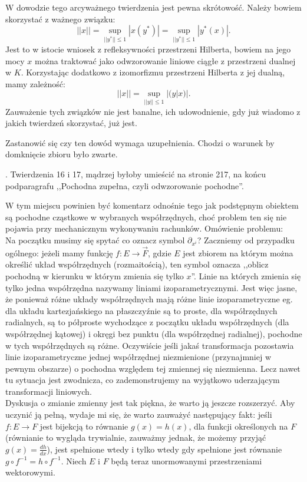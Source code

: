 \documentclass[a4paper,11pt]{article}
\begin{document}
\start {} W dowodzie tego arcyważnego twierdzenia jest pewna
skrótowość. Należy bowiem skorzystać z ważnego związku:
$$|| x || = \sup_{ || y^{ * } || \leq1 } | x( y^{ * } ) | = \sup_{ || y^{ * } || \leq1 } | y^{ * }( x ) | \textrm{.}$$
Jest to w istocie wniosek z refleksywności przestrzeni Hilberta,
bowiem na jego mocy $x$ można traktować jako odwzorowanie liniowe
ciągłe z przestrzeni dualnej w $K$. Korzystając dodatkowo z
izomorfizmu przestrzeni Hilberta z jej dualną, mamy \linebreak
zależność:
$$|| x || = \sup_{ || y || \leq 1 } | ( y | x ) | \textrm{.}$$
Zauważenie tych związków nie jest banalne, ich udowodnienie, gdy już
wiadomo z jakich twierdzeń skorzystać, już jest.

\start {} Zastanowić się czy ten dowód wymaga uzupełnienia.
Chodzi o warunek by domknięcie zbioru było zwarte.

\start {}. Twierdzenia 16 i 17, mądrzej byłoby umieścić na
stronie 217, na końcu podparagrafu ,,Pochodna zupełna, czyli
odwzorowanie pochodne''.
  
\start {} W tym miejscu powinien być komentarz odnośnie tego
jak podstępnym obiektem są pochodne cząstkowe w wybranych
współrzędnych, choć problem ten się nie pojawia przy mechanicznym
wykonywaniu rachunków.
Omówienie problemu: \\
Na początku musimy się spytać co oznacz symbol $\partial_{ x^{ i } }$?
Zaczniemy od przypadku ogólnego: jeżeli mamy funkcję
$f : E \rightarrow \vec{ F }$, gdzie $E$ jest zbiorem na którym można
określić układ współrzędnych (rozmaitością), ten symbol oznacza
,,oblicz pochodną w kierunku w którym zmienia się tylko $x$''. Linie
na których zmienia się tylko jedna współrzędna nazywamy liniami
izoparametrycznymi. Jest więc jasne, że ponieważ różne układy
współrzędnych mają różne linie izoparametryczne eg. dla układu
kartezjańskiego na płaszczyźnie są to proste, dla współrzędnych
radialnych, są to półproste wychodzące z początku układu współrzędnych
(dla współrzędnej kątowej) i okręgi bez punktu (dla współrzędnej
radialnej), pochodne w tych współrzędnych są różne. Oczywiście jeśli
jakaś transformacja pozostawia linie izoparametryczne jednej
współrzędnej niezmienione (przynajmniej w pewnym obszarze) o pochodna
względem tej zmiennej się niezmienna. Lecz nawet tu sytuacja jest
zwodnicza, co zademonstrujemy na wyjątkowo uderzającym
transformacji liniowych.\\

\start {} Dyskusja o zmianie zmienny jest tak piękna, że warto
ją jeszcze rozszerzyć. Aby uczynić ją pełną, wydaje mi się, że warto
zauważyć następujący fakt: jeśli $f : E \rightarrow F$ jest bijekcją
to równanie $ g( x ) = h( x ) $, dla funkcji określonych na $F$
(równianie to wygląda trywialnie, zauważmy jednak, że możemy przyjąć
$g( x ) = \frac{ d h }{ d x }$), jest spełnione wtedy i tylko wtedy
gdy spełnione jest równanie $g \circ f^{ -1 } = h \circ f^{ -1 }$.
Niech $E$ i $F$ będą teraz unormowanymi przestrzeniami wektorowymi.
\end{document}
